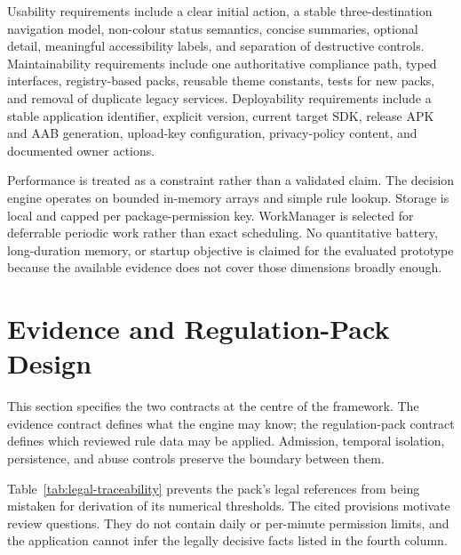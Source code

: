 Usability requirements include a clear initial action, a stable three-destination navigation model, non-colour status semantics, concise summaries, optional detail, meaningful accessibility labels, and separation of destructive controls. Maintainability requirements include one authoritative compliance path, typed interfaces, registry-based packs, reusable theme constants, tests for new packs, and removal of duplicate legacy services. Deployability requirements include a stable application identifier, explicit version, current target SDK, release APK and AAB generation, upload-key configuration, privacy-policy content, and documented owner actions.

Performance is treated as a constraint rather than a validated claim. The decision engine operates on bounded in-memory arrays and simple rule lookup. Storage is local and capped per package-permission key. WorkManager is selected for deferrable periodic work rather than exact scheduling. No quantitative battery, long-duration memory, or startup objective is claimed for the evaluated prototype because the available evidence does not cover those dimensions broadly enough.

\section{Evidence and Regulation-Pack Design}

This section specifies the two contracts at the centre of the framework. The evidence contract defines what the engine may know; the regulation-pack contract defines which reviewed rule data may be applied. Admission, temporal isolation, persistence, and abuse controls preserve the boundary between them.

Table~\ref{tab:legal-traceability} prevents the pack's legal references from being mistaken for derivation of its numerical thresholds. The cited provisions motivate review questions. They do not contain daily or per-minute permission limits, and the application cannot infer the legally decisive facts listed in the fourth column.


